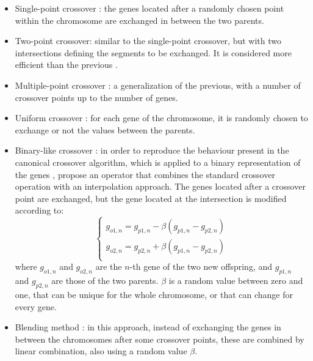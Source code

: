 \documentclass{ametsoc}
\begin{document}
\begin{itemize}
	\item Single-point crossover \citep{Goldberg1989}: the genes located after a randomly chosen point within the chromosome are exchanged in between the two parents.
	
	\item Two-point crossover: similar to the single-point crossover, but with two intersections defining the segments to be exchanged. It is considered more efficient than the previous \citep{Beasley1993a}.
	
	\item Multiple-point crossover \citep{DeJong1975a}: a generalization of the previous, with a number of crossover points up to the number of genes.
	
	\item Uniform crossover \citep{Syswerda1989}: for each gene of the chromosome, it is randomly chosen to exchange or not the values between the parents.
	
	\item Binary-like crossover \citep{Haupt2004}: in order to reproduce the behaviour present in the canonical crossover algorithm, which is applied to a binary representation of the genes \citep{Goldberg1989, Goldberg1990a, Herrera1998a}, \citet{Haupt2004} propose an operator that combines the standard crossover operation with an interpolation approach. The genes located after a crossover point are exchanged, but the gene located at the intersection is modified according to:
	\begin{equation}
	\left\lbrace \begin{array}{l} 
	g_{o1,n} = g_{p1,n} - \beta (g_{p1,n} - g_{p2,n}) \\
	g_{o2,n} = g_{p2,n} + \beta (g_{p1,n} - g_{p2,n}) \\
	\end{array} \right.
	\label{eq:binary_like_crossover}
	\end{equation}
	where $g_{o1,n}$ and $g_{o2,n}$ are the $n$-th gene of the two new offspring, and $g_{p1,n}$ and $g_{p2,n}$ are those of the two parents. $\beta$ is a random value between zero and one, that can be unique for the whole chromosome, or that can change for every gene.
	
	\item Blending method \citep{Radcliffe1991a}: in this approach, instead of exchanging the genes in between the chromosomes after some crossover points, these are combined by linear combination, also using a random value $\beta$.
	

\end{itemize}
\end{document}
